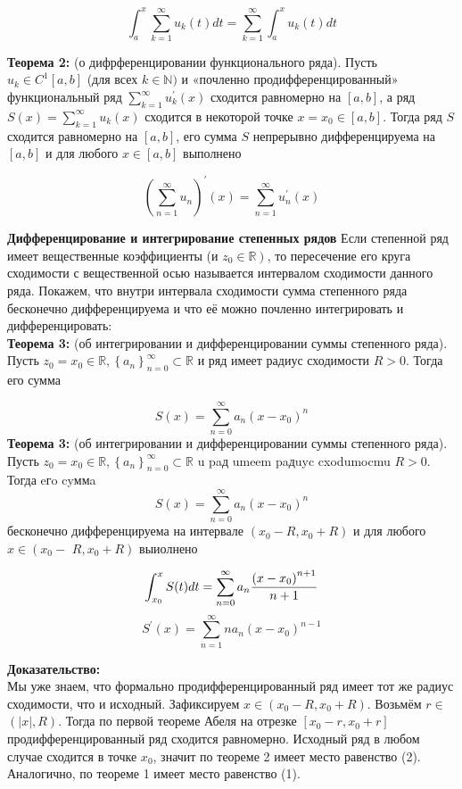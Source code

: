 \documentclass[a4paper,12pt]{article} %
\begin{document}
$$
\int_{a}^{x} \sum_{k=1}^{\infty} u_{k}(t) d t=\sum_{k=1}^{\infty} \int_{a}^{x} u_{k}(t) d t
$$

\textbf{Теорема 2:} (о дифрференцировании функционального ряда). Пусть $u_{k} \in C^{1}[a, b]$ (для всех $k \in \mathbb{N})$ и «почленно продифференцированный» функциональный ряд $\sum_{k=1}^{\infty} u_{k}^{\prime}(x)$ сходится равномерно на $[a, b]$, а ряд $S(x)=\sum_{k=1}^{\infty} u_{k}(x)$ сходится в некоторой точке $x=x_{0} \in[a, b]$. Тогда ряд $S$ сходится равномерно на $[a, b]$, его сумма $S$ непрерывно дифференцируема на $[a, b]$ и для любого $x \in[a, b]$ выполнено

$$
\left(\sum_{n=1}^{\infty} u_{n}\right)^{\prime}(x)=\sum_{n=1}^{\infty} u_{n}^{\prime}(x)
$$

\textbf{Дифференцирование и интегрирование степенных рядов}
Если степенной ряд имеет вещественные коэффициенты (и $\left.z_{0} \in \mathbb{R}\right)$, то пересечение его круга сходимости с вещественной осью называется интервалом сходимости данного ряда. Покажем, что внутри интервала сходимости сумма степенного ряда бесконечно дифференцируема и что её можно почленно интегрировать и дифференцировать:\\ \textbf{Теорема 3:} (об интегрировании и дифференцировании суммы степенного ряда). Пусть $z_{0}=x_{0} \in \mathbb{R},\left\{a_{n}\right\}_{n=0}^{\infty} \subset \mathbb{R}$ и ряд имеет радиус сходимости $R>0$. Тогда его сумма

$$
S(x)=\sum_{n=0}^{\infty} a_{n}\left(x-x_{0}\right)^{n}
$$
\textbf{Теорема 3:} (об интегрировании и дифференцировании суммы степенного ряда). Пусть $z_0=x_0 \in \mathbb{R},\left\{a_n\right\}_{n=0}^{\infty} \subset \mathbb{R}$ u paд umeem paдuyc cxodumocmu $R>0$. Тогда eгo cyммa
$$
S(x)=\sum_{n=0}^{\infty} a_n\left(x-x_0\right)^n
$$
бесконечно дифференцируема на интервале $\left(x_{0}-R, x_{0}+R\right)$ и для любого $x \in\left(x_{0}-\right.$ $\left.R, x_{0}+R\right)$ выиолнено

\begin{equation}\label{2)}
\int_{x_{0}}^{x} S(t) d t=\sum_{n=0}^{\infty} a_{n} \frac{\left(x-x_{0}\right)^{n+1}}{n+1} \\
\end{equation}
\begin{equation}\label{3)}
S^{\prime}(x)=\sum_{n=1}^{\infty} n a_{n}\left(x-x_{0}\right)^{n-1}
\end{equation}

\textbf{Доказательство:}\\
Мы уже знаем, что формально продифференцированный ряд имеет тот же радиус сходимости, что и исходный. Зафиксируем $x \in\left(x_{0}-R, x_{0}+R\right)$. Возьмём $r \in$ $(|x|, R)$. Тогда по первой теореме Абеля на отрезке $\left[x_{0}-r, x_{0}+r\right]$ продифференцированный ряд сходится равномерно. Исходный ряд в любом случае сходится в точке $x_{0}$, значит по теореме 2 имеет место равенство (2). Аналогично, по теореме 1 имеет место равенство (1).
\end{document}
